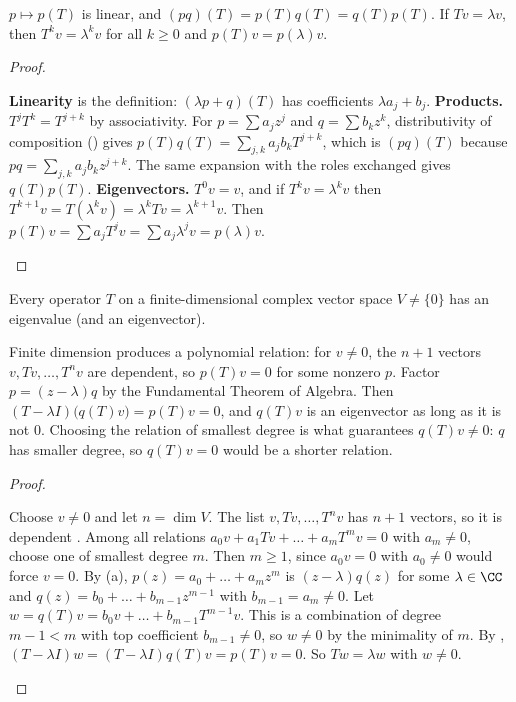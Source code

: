 \documentclass[10pt]{scrartcl}
\begin{document}
\begin{proposition*}
  \begin{enumerate}[(a)]
    \ii $p\mapsto p(T)$ is linear, and $(pq)(T)=p(T)q(T)=q(T)p(T)$.
    \ii If $Tv=\lambda v$, then $T^kv=\lambda^kv$ for all $k\ge0$ and $p(T)v=p(\lambda)v$.
  \end{enumerate}
\end{proposition*}
\begin{proof}
  \begin{steps}
    \ii \textbf{Linearity} is the definition: $(\lambda p+q)(T)$ has coefficients $\lambda a_j+b_j$.
    \ii \textbf{Products.} $T^jT^k=T^{j+k}$ by associativity. For $p=\sum a_jz^j$ and $q=\sum b_kz^k$, distributivity of composition () gives $p(T)q(T)=\sum_{j,k}a_jb_kT^{j+k}$, which is $(pq)(T)$ because $pq=\sum_{j,k}a_jb_kz^{j+k}$. The same expansion with the roles exchanged gives $q(T)p(T)$.
    \ii \textbf{Eigenvectors.} $T^0v=v$, and if $T^kv=\lambda^kv$ then $T^{k+1}v=T(\lambda^kv)=\lambda^kTv=\lambda^{k+1}v$. Then $p(T)v=\sum a_jT^jv=\sum a_j\lambda^jv=p(\lambda)v$.
  \end{steps}
\end{proof}

\begin{theorem*}
  Every operator $T$ on a finite-dimensional complex vector space $V\ne\{0\}$ has an eigenvalue (and an eigenvector).
\end{theorem*}
\begin{ideabox}
  Finite dimension produces a polynomial relation: for $v\ne 0$, the $n+1$ vectors $v,Tv,\dots,T^nv$ are dependent, so $p(T)v=0$ for some nonzero $p$. Factor $p=(z-\lambda)q$ by the Fundamental Theorem of Algebra. Then $(T-\lambda I)\bigl(q(T)v\bigr)=p(T)v=0$, and $q(T)v$ is an eigenvector as long as it is not $0$. Choosing the relation of smallest degree is what guarantees $q(T)v\ne0$: $q$ has smaller degree, so $q(T)v=0$ would be a shorter relation.
\end{ideabox}
\begin{proof}
  \begin{steps}
    \ii Choose $v\ne 0$ and let $n=\dim V$. The list $v,Tv,\dots,T^nv$ has $n+1$ vectors, so it is dependent .
    \ii Among all relations $a_0v+a_1Tv+\dots+a_mT^mv=0$ with $a_m\ne 0$, choose one of smallest degree $m$. Then $m\ge 1$, since $a_0v=0$ with $a_0\ne0$ would force $v=0$.
    \ii By (a), $p(z)=a_0+\dots+a_mz^m$ is $(z-\lambda)q(z)$ for some $\lambda\in\CC$ and $q(z)=b_0+\dots+b_{m-1}z^{m-1}$ with $b_{m-1}=a_m\ne 0$.
    \ii Let $w=q(T)v=b_0v+\dots+b_{m-1}T^{m-1}v$. This is a combination of degree $m-1<m$ with top coefficient $b_{m-1}\ne0$, so $w\ne 0$ by the minimality of $m$.
    \ii By , $(T-\lambda I)w=(T-\lambda I)q(T)v=p(T)v=0$. So $Tw=\lambda w$ with $w\ne 0$.
  \end{steps}
\end{proof}
\end{document}
